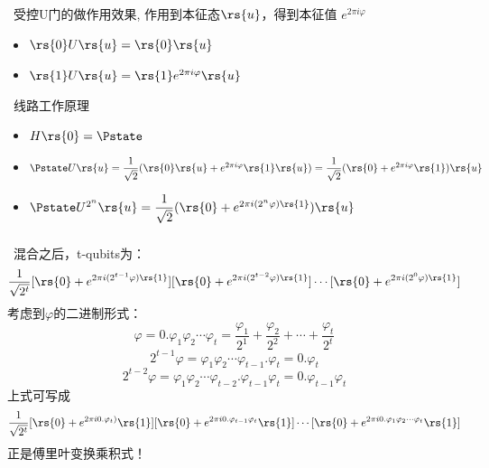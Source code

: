\begin{frame}
\begin{figure}
{
    }
    \end{figure}
\end{frame}

\begin{frame}
    {\Bullet}~受控U门的做作用效果, 作用到本征态$\rs{u}$，得到本征值 $e^{2\pi i \varphi}$ 
    \begin{itemize}
        \item $\rs{0}U\rs{u}=\rs{0}\rs{u}$
        \item $\rs{1}U\rs{u}=\rs{1} e^{2\pi i \varphi}\rs{u}$ 
    \end{itemize}
    {\Bullet}~线路工作原理 \\
    \begin{itemize}
        \item $H\rs{0}=\Pstate$
        \item $\Pstate U\rs{u}=\dfrac{1}{\sqrt{2}} (\rs{0}\rs{u} +  e^{2\pi i \varphi}\rs{1}\rs{u})= \dfrac{1}{\sqrt{2}} (\rs{0} +  e^{2\pi i \varphi}\rs{1})\rs{u} $ 
        \item $\Pstate U^{2^n}\rs{u}= \dfrac{1}{\sqrt{2}} (\rs{0} + e^{2\pi i (2^n \varphi)\rs{1} })\rs{u} $ 
    \end{itemize}
\end{frame}

\begin{frame}
    \frametitle{}
    {\Bullet}~混合之后，t-qubits为：
    \[ \dfrac{1}{\sqrt{2^t}} [\rs{0} + e^{2\pi i (2^{t-1} \varphi)\rs{1} }] [\rs{0} + e^{2\pi i (2^{t-2} \varphi)\rs{1} }]\cdots [\rs{0} + e^{2\pi i (2^0 \varphi)\rs{1} }] \]
    考虑到$\varphi$的二进制形式：
    \[\varphi=0.\varphi_1 \varphi_2 \cdots \varphi_t = \frac{\varphi_1}{2^1} + \frac{\varphi_2}{2^2}+\cdots + \frac{\varphi_t}{2^t}\]
    \[2^{t-1} \varphi= \varphi_1 \varphi_2 \cdots \varphi_{t-1}.\varphi_t=0.\varphi_t\]
    \[2^{t-2} \varphi= \varphi_1 \varphi_2 \cdots \varphi_{t-2}.\varphi_{t-1}\varphi_t=0.\varphi_{t-1}\varphi_t\]
    上式可写成
    \[ \dfrac{1}{\sqrt{2^t}} [\rs{0} + e^{2\pi i 0.\varphi_t)}\rs{1} ] [\rs{0} + e^{2\pi i 0.\varphi_{t-1}\varphi_t }\rs{1} ]\cdots [\rs{0} + e^{2\pi i 0.\varphi_1\varphi_2\cdots \varphi_t}\rs{1}] \]
    正是傅里叶变换乘积式！ 
\end{frame}

